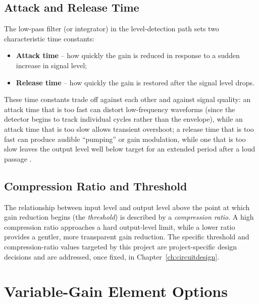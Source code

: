 \subsection{Attack and Release Time}

The low-pass filter (or integrator) in the level-detection path sets two characteristic time constants:
\begin{itemize}
    \item \textbf{Attack time} -- how quickly the gain is reduced in response to a sudden increase in signal level;
    \item \textbf{Release time} -- how quickly the gain is restored after the signal level drops.
\end{itemize}
These time constants trade off against each other and against signal quality: an attack time that is too fast can distort low-frequency waveforms (since the detector begins to track individual cycles rather than the envelope), while an attack time that is too slow allows transient overshoot; a release time that is too fast can produce audible ``pumping'' or gain modulation, while one that is too slow leaves the output level well below target for an extended period after a loud passage \cite{ref6}.

\subsection{Compression Ratio and Threshold}

The relationship between input level and output level above the point at which gain reduction begins (the \emph{threshold}) is described by a \emph{compression ratio}. A high compression ratio approaches a hard output-level limit, while a lower ratio provides a gentler, more transparent gain reduction. The specific threshold and compression-ratio values targeted by this project are project-specific design decisions and are addressed, once fixed, in Chapter~\ref{ch:circuitdesign}.

\section{Variable-Gain Element Options}

